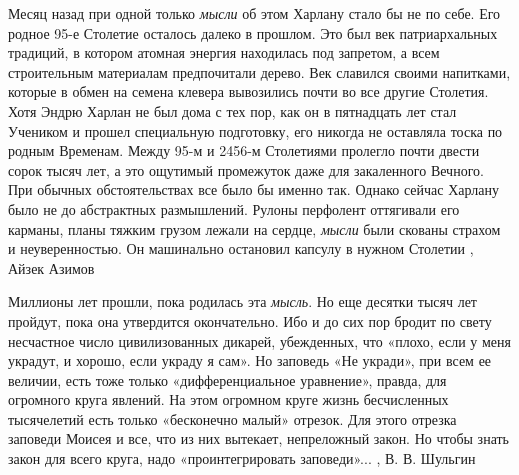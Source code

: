 Месяц назад при одной только \emph{мысли} об этом Харлану стало бы не по себе.
Его родное 95-е Столетие осталось далеко в прошлом. Это был век патриархальных
традиций, в котором атомная энергия находилась под запретом, а всем
строительным материалам предпочитали дерево. Век славился своими напитками,
которые в обмен на семена клевера вывозились почти во все другие Столетия. Хотя
Эндрю Харлан не был дома с тех пор, как он в пятнадцать лет стал Учеником и
прошел специальную подготовку, его никогда не оставляла тоска по родным
Временам. Между 95-м и 2456-м Столетиями пролегло почти двести сорок тысяч лет,
а это ощутимый промежуток даже для закаленного Вечного. При обычных
обстоятельствах все было бы именно так.  Однако сейчас Харлану было не до
абстрактных размышлений. Рулоны перфолент оттягивали его карманы, планы тяжким
грузом лежали на сердце, \emph{мысли} были скованы страхом и неуверенностью. Он
машинально остановил капсулу в нужном Столетии
, Айзек Азимов

Миллионы лет прошли, пока родилась эта \emph{мысль}. Но еще десятки тысяч лет
пройдут, пока она утвердится окончательно. Ибо и до сих пор бродит по свету
несчастное число цивилизованных дикарей, убежденных, что «плохо, если у меня
украдут, и хорошо, если украду я сам».  Но заповедь «Не укради», при всем ее
величии, есть тоже только «дифференциальное уравнение», правда, для огромного
круга явлений. На этом огромном круге жизнь бесчисленных тысячелетий есть
только «бесконечно малый» отрезок. Для этого отрезка заповеди Моисея и все, что
из них вытекает, непреложный закон. Но чтобы знать закон для всего круга, надо
«проинтегрировать заповеди»...
, В. В. Шульгин
